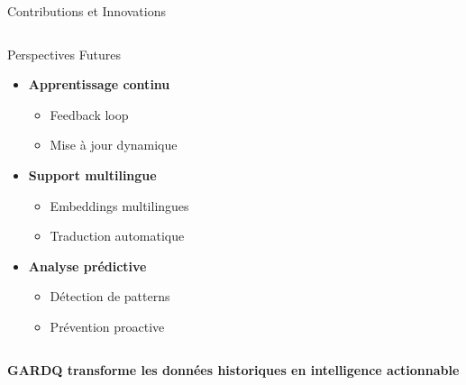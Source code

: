 \documentclass[10pt, aspectratio=169]{beamer}
\begin{document}
\begin{frame}{Contributions et Innovations}
\begin{columns}[T]
        \begin{column}{0.5\textwidth}
            \begin{block}{Perspectives Futures}
                \begin{itemize}
                    \item \faLightbulb{} \textbf{Apprentissage continu}
                    \begin{itemize}
                        \footnotesize
                        \item Feedback loop
                        \item Mise à jour dynamique
                    \end{itemize}
                    \item \faGlobe{} \textbf{Support multilingue}
                    \begin{itemize}
                        \footnotesize
                        \item Embeddings multilingues
                        \item Traduction automatique
                    \end{itemize}
                    \item \faChartLine{} \textbf{Analyse prédictive}
                    \begin{itemize}
                        \footnotesize
                        \item Détection de patterns
                        \item Prévention proactive
                    \end{itemize}
                \end{itemize}
            \end{block}
        \end{column}
    \end{columns}
    
    \vspace{0.5cm}
    \begin{center}
        \Large
        \textbf{GARDQ transforme les données historiques en intelligence actionnable}
    \end{center}
\end{frame}
\end{document}
